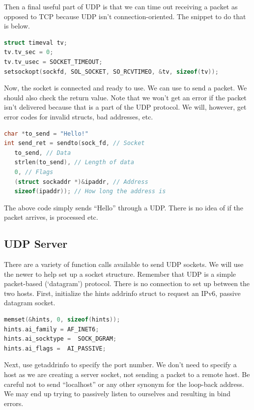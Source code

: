 Then a final useful part of UDP is that we can time out receiving a packet as opposed to TCP because UDP isn't connection-oriented.
The snippet to do that is below.

\begin{lstlisting}[language=C]
struct timeval tv;
tv.tv_sec = 0;
tv.tv_usec = SOCKET_TIMEOUT;
setsockopt(sockfd, SOL_SOCKET, SO_RCVTIMEO, &tv, sizeof(tv));
\end{lstlisting}

Now, the socket is connected and ready to use.
We can use  to send a packet.
We should also check the return value.
Note that we won't get an error if the packet isn't delivered because that is a part of the UDP protocol.
We will, however, get error codes for invalid structs, bad addresses, etc.

\begin{lstlisting}[language=C]
char *to_send = "Hello!"
int send_ret = sendto(sock_fd, // Socket
   to_send, // Data
   strlen(to_send), // Length of data
   0, // Flags
   (struct sockaddr *)&ipaddr, // Address
   sizeof(ipaddr)); // How long the address is
\end{lstlisting}

The above code simply sends ``Hello'' through a UDP.
There is no idea of if the packet arrives, is processed etc.

\subsection{UDP Server}

There are a variety of function calls available to send UDP sockets.
We will use the newer  to help set up a socket structure.
Remember that UDP is a simple packet-based (`datagram') protocol.
There is no connection to set up between the two hosts.
First, initialize the hints addrinfo struct to request an IPv6, passive datagram socket.

\begin{lstlisting}[language=C]
memset(&hints, 0, sizeof(hints));
hints.ai_family = AF_INET6;
hints.ai_socktype =  SOCK_DGRAM;
hints.ai_flags =  AI_PASSIVE;
\end{lstlisting}

Next, use getaddrinfo to specify the port number.
We don't need to specify a host as we are creating a server socket, not sending a packet to a remote host.
Be careful not to send ``localhost'' or any other synonym for the loop-back address.
We may end up trying to passively listen to ourselves and resulting in bind errors.


